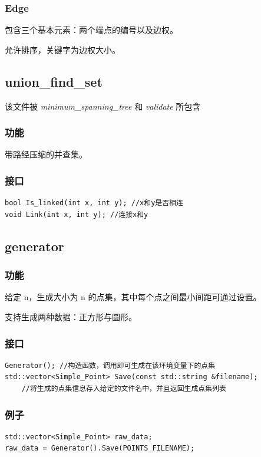 \documentclass[a4paper]{article}
\begin{document}
\subsubsection{Edge}

包含三个基本元素：两个端点的编号以及边权。

允许排序，关键字为边权大小。

\subsection{union\_find\_set}

该文件被 \emph{minimum\_spanning\_tree} 和 \emph{validate} 所包含

\subsubsection{功能}

带路经压缩的并查集。

\subsubsection{接口}

\begin{lstlisting}
bool Is_linked(int x, int y); //x和y是否相连
void Link(int x, int y); //连接x和y
\end{lstlisting}

\subsection{generator}
\subsubsection{功能}
给定 n，生成大小为 n 的点集，其中每个点之间最小间距可通过设置。

支持生成两种数据：正方形与圆形。
\subsubsection{接口}
\begin{lstlisting}
Generator(); //构造函数，调用即可生成在该环境变量下的点集
std::vector<Simple_Point> Save(const std::string &filename);
    //将生成的点集信息存入给定的文件名中，并且返回生成点集列表
\end{lstlisting}
\subsubsection{例子}
\begin{lstlisting}
std::vector<Simple_Point> raw_data;
raw_data = Generator().Save(POINTS_FILENAME);	
\end{lstlisting}
\end{document}
